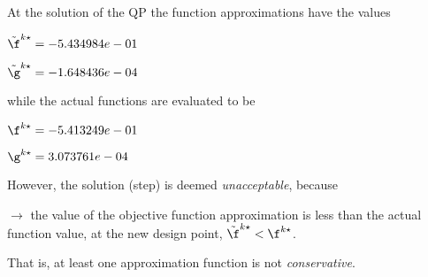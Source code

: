 At the solution of the QP the function approximations have the values

$\tilde \f^{k\star} = -5.434984e-01$

$\tilde \g^{k\star} = -1.648436e-04$

\bigskip
while the actual functions are evaluated to be

$\f^{k\star} = -5.413249e-01$

$\g^{k\star} =  3.073761e-04$

\bigskip
 However, the solution (step)                     is deemed \emph{unacceptable}, because 
 
$\to$ the value of the objective                         function approximation is less than the actual function                         value, at the new design point,                         $\tilde {\f}^{k\star} < {\f}^{k\star}$.

 \bigskip 

 That is, at least one approximation                     function is not \emph{conservative}.
